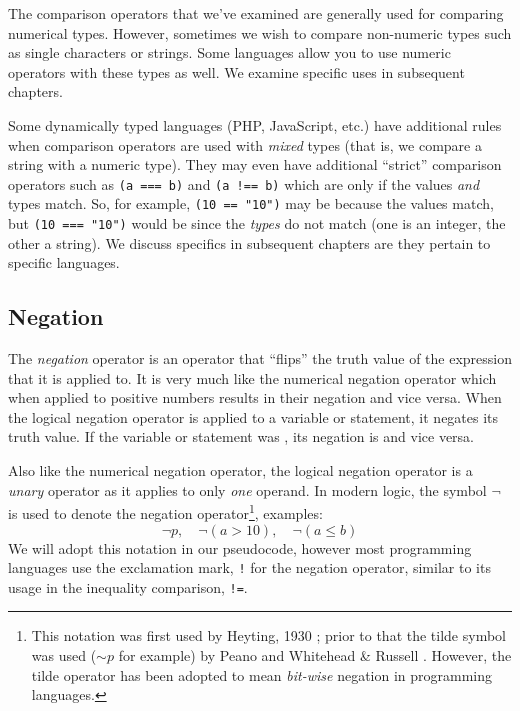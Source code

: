 The comparison operators that we've examined are generally used for comparing
numerical types.  However, sometimes we wish to compare non-numeric 
types such as single characters or strings.  Some languages allow you to
use numeric operators with these types as well.  We examine specific uses
in subsequent chapters.

Some dynamically typed languages (PHP, JavaScript, etc.) have additional rules 
when comparison operators are used with \emph{mixed} types (that is, we compare
a string with a numeric type).  They may even have additional ``strict'' comparison
operators such as \texttt{(a === b)} and \texttt{(a !== b)} which are \True only if
the values \emph{and} types match.  So, for example, \texttt{(10 == "10")} may
be \True because the values match, but \texttt{(10 === "10")} would be \False
since the \emph{types} do not match (one is an integer, the other a string).  We
discuss specifics in subsequent chapters are they pertain to specific languages.

\subsection{Negation}

The \emph{negation} operator is an operator that ``flips'' the truth value of
the expression that it is applied to.  It is very much like the numerical negation
operator which when applied to positive numbers results in their negation and
vice versa.  When the logical negation operator is applied to a variable or
statement, it negates its truth value.  If the variable or statement was \True, 
its negation is \False and vice versa.  

Also like the numerical negation operator, the logical negation operator is
a \emph{unary} operator as it applies to only \emph{one} operand.  In modern
logic, the symbol $\neg$ is used to denote the negation operator\footnote{
This notation was first used by Heyting, 1930 \cite{Heyting1930}; prior to that
the tilde symbol was used ($\mathord{\sim} p$ for example) by Peano \cite{GlossarWiki:Peano:1897a} and
Whitehead \& Russell \cite{WhiteheadRussell1910}.  However, the tilde operator
has been adopted to mean \emph{bit-wise} negation in programming languages.}, 
examples:
  $$\neg p, \quad \neg(a > 10), \quad \neg(a \leq b)$$
We will adopt this notation in our pseudocode, however most programming 
languages use the exclamation mark, \texttt{!} for the negation operator, 
similar to its usage in the inequality comparison, \texttt{!=}.

